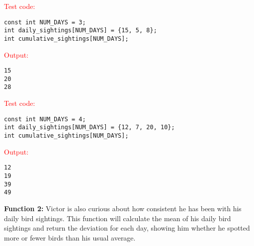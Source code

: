 \begin{sample}
\textcolor{red}{Test code:}
\begin{verbatim}
const int NUM_DAYS = 3;
int daily_sightings[NUM_DAYS] = {15, 5, 8};
int cumulative_sightings[NUM_DAYS];
\end{verbatim}
\textcolor{red}{Output:}
\begin{verbatim}
15
20
28
\end{verbatim}
\end{sample}

\begin{sample}
\textcolor{red}{Test code:}
\begin{verbatim}
const int NUM_DAYS = 4;
int daily_sightings[NUM_DAYS] = {12, 7, 20, 10};
int cumulative_sightings[NUM_DAYS];
\end{verbatim}
\textcolor{red}{Output:}
\begin{verbatim}
12
19
39
49
\end{verbatim}
\end{sample}

\textbf{Function 2:} Victor is also curious about how consistent he has been with his daily bird sightings. This function will calculate the mean of his daily bird sightings and return the deviation for each day, showing him whether he spotted more or fewer birds than his usual average.

